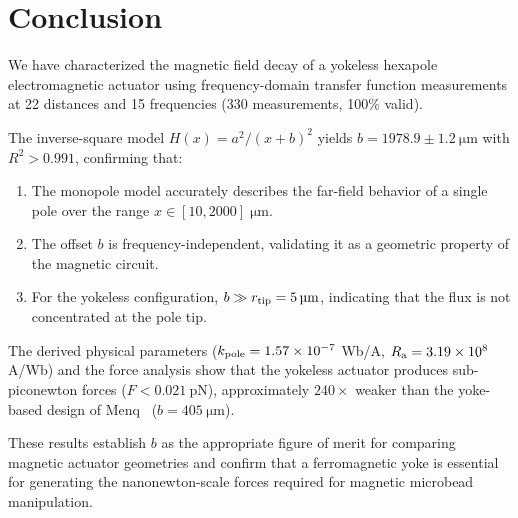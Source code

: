 \section{Conclusion}
\label{sec:conclusion}

We have characterized the magnetic field decay of a yokeless hexapole
electromagnetic actuator using frequency-domain transfer function measurements
at 22 distances and 15 frequencies (330 measurements, 100\% valid).

The inverse-square model $H(x) = a^2/(x+b)^2$ yields
$b = 1978.9 \pm \SI{1.2}{\um}$ with $R^2 > 0.991$, confirming that:

\begin{enumerate}
\item The monopole model accurately describes the far-field behavior of a
single pole over the range $x \in [10, 2000]\;\si{\um}$.

\item The offset $b$ is frequency-independent, validating it as a geometric
property of the magnetic circuit.

\item For the yokeless configuration, $b \gg \rtip = \SI{5}{\um}$, indicating
that the flux is not concentrated at the pole tip.
\end{enumerate}

The derived physical parameters
($k_\mathrm{pole} = 1.57 \times 10^{-7}$ Wb/A,
$R_\mathrm{a} = 3.19 \times 10^8$ A/Wb) and the force analysis show that the yokeless
actuator produces sub-piconewton forces ($F < \SI{0.021}{\pico\newton}$),
approximately $240\times$ weaker than the yoke-based design of
Menq~\cite{Zhang2010} ($b = \SI{405}{\um}$).

These results establish $b$ as the appropriate figure of merit for comparing
magnetic actuator geometries and confirm that a ferromagnetic yoke is essential
for generating the nanonewton-scale forces required for magnetic microbead
manipulation.
